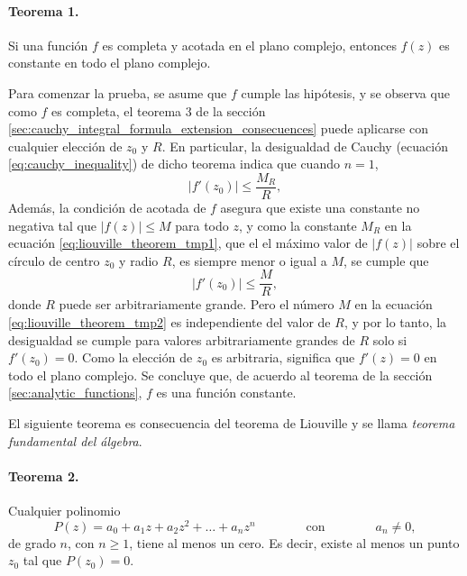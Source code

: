 \documentclass[a4paper]{report}
\begin{document}
\paragraph{Teorema 1.} Si una función \(f\) es completa y acotada en el plano complejo, entonces \(f(z)\) es constante en todo el plano complejo.

Para comenzar la prueba, se asume que \(f\) cumple las hipótesis, y se observa que como \(f\) es completa, el teorema 3 de la sección \ref{sec:cauchy_integral_formula_extension_consecuences} puede aplicarse con cualquier elección de \(z_0\) y \(R\). En particular, la desigualdad de Cauchy (ecuación \ref{eq:cauchy_inequality}) de dicho teorema indica que cuando \(n=1\),
\begin{equation}\label{eq:liouville_theorem_tmp1}
 |f'(z_0)|\leq\frac{M_R}{R}, 
\end{equation}
Además, la condición de acotada de \(f\) asegura que existe una constante no negativa tal que \(|f(z)|\leq M\) para todo \(z\), y como la constante \(M_R\) en la ecuación \ref{eq:liouville_theorem_tmp1}, que el el máximo valor de \(|f(z)|\) sobre el círculo de centro \(z_0\) y radio \(R\), es siempre menor o igual a \(M\), se cumple que 
\begin{equation}\label{eq:liouville_theorem_tmp2}
 |f'(z_0)|\leq\frac{M}{R}, 
\end{equation}
donde \(R\) puede ser arbitrariamente grande. Pero el número \(M\) en la ecuación \ref{eq:liouville_theorem_tmp2} es independiente del valor de \(R\), y por lo tanto, la desigualdad se cumple para valores arbitrariamente grandes de \(R\) solo si \(f'(z_0)=0\). Como la elección de \(z_0\) es arbitraria, significa que \(f'(z)=0\) en todo el plano complejo. Se concluye que, de acuerdo al teorema de la sección \ref{sec:analytic_functions}, \(f\) es una función constante.

El siguiente teorema es consecuencia del teorema de Liouville y se llama \emph{teorema fundamental del álgebra}.

\paragraph{Teorema 2.} Cualquier polinomio
\[
 P(z)=a_0+a_1z+a_2z^2+\dots+a_nz^n
 \qquad\qquad\textrm{con}\qquad\qquad 
 a_n\neq0,
\]
de grado \(n\), con \(n\geq1\), tiene al menos un cero. Es decir, existe al menos un punto \(z_0\) tal que \(P(z_0)=0\).
\end{document}
